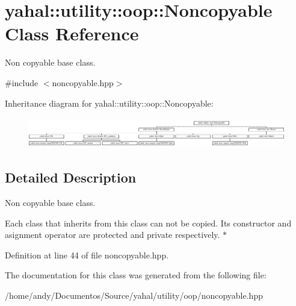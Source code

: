 \hypertarget{classyahal_1_1utility_1_1oop_1_1_noncopyable}{}\section{yahal\+:\+:utility\+:\+:oop\+:\+:Noncopyable Class Reference}
\label{classyahal_1_1utility_1_1oop_1_1_noncopyable}


Non copyable base class.  




{\ttfamily \#include $<$noncopyable.\+hpp$>$}

Inheritance diagram for yahal\+:\+:utility\+:\+:oop\+:\+:Noncopyable\+:\begin{figure}[H]
\begin{center}
\leavevmode
\includegraphics[height=1.350211cm]{classyahal_1_1utility_1_1oop_1_1_noncopyable}
\end{center}
\end{figure}


\subsection{Detailed Description}
Non copyable base class. 

Each class that inherits from this class can not be copied. Its constructor and asignment operator are protected and private respectively. $\ast$ 

Definition at line 44 of file noncopyable.\+hpp.



The documentation for this class was generated from the following file\+:\begin{DoxyCompactItemize}
\item 
/home/andy/\+Documentos/\+Source/yahal/utility/oop/noncopyable.\+hpp\end{DoxyCompactItemize}
